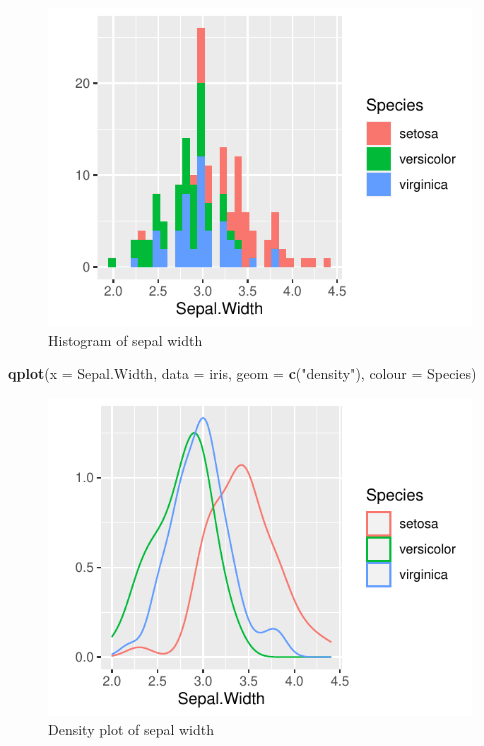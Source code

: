 \documentclass[]{article}
\newenvironment{Shaded}{\begin{snugshade}}{\end{snugshade}}
\newcommand{\DataTypeTok}[1]{\textcolor[rgb]{0.13,0.29,0.53}{#1}}
\newcommand{\KeywordTok}[1]{\textcolor[rgb]{0.13,0.29,0.53}{\textbf{#1}}}
\newcommand{\NormalTok}[1]{#1}
\newcommand{\StringTok}[1]{\textcolor[rgb]{0.31,0.60,0.02}{#1}}
\begin{document}
\begin{figure}
\centering
\includegraphics{Week3Answers_files/figure-latex/unnamed-chunk-13-1.pdf}
\caption{Histogram of sepal width}
\end{figure}

\begin{Shaded}
\begin{Highlighting}[]
\KeywordTok{qplot}\NormalTok{(}\DataTypeTok{x =}\NormalTok{ Sepal.Width, }\DataTypeTok{data =}\NormalTok{ iris, }\DataTypeTok{geom =} \KeywordTok{c}\NormalTok{(}\StringTok{"density"}\NormalTok{), }
     \DataTypeTok{colour =}\NormalTok{ Species)}
\end{Highlighting}
\end{Shaded}

\begin{figure}
\centering
\includegraphics{Week3Answers_files/figure-latex/unnamed-chunk-14-1.pdf}
\caption{Density plot of sepal width}
\end{figure}
\end{document}

